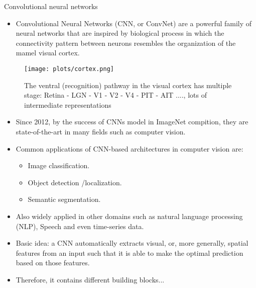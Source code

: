 






\begin{vbframe}{Convolutional neural networks}
  \begin{itemize}
    \item Convolutional Neural Networks (CNN, or ConvNet) are a powerful family of neural networks that are inspired by biological process in which the connectivity pattern between neurons resembles the organization of the mamel visual cortex.
    \end{itemize}
 \begin{figure}
    \centering
    \texttt{[image: plots/cortex.png]}
    \caption{The ventral (recognition) pathway in the visual cortex has multiple stage: Retina - LGN - V1 - V2 - V4 - PIT - AIT ...., lots of intermediate representations}
  \end{figure}

\begin{itemize}
    \item Since 2012, by the success of CNNs model in ImageNet compition, they are state-of-the-art in many fields such as computer vision.
    \item Common applications of CNN-based architectures in computer vision are:
    \begin{itemize}
      \item Image classification.
      \item Object detection /localization.
      \item Semantic segmentation.
    \end{itemize}
    \item Also widely applied in other domains such as natural language processing (NLP), Speech and even time-series data.
    \item Basic idea: a CNN automatically extracts visual, or, more generally, spatial features from an input such that it is able to make the optimal prediction based on those features.
    \item Therefore, it contains different building blocks...
  \end{itemize}
\end{vbframe}


